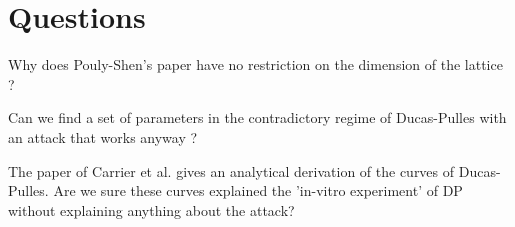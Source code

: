 \documentclass{article}
\begin{document}
\section{Questions} 

Why does Pouly-Shen's paper have no restriction on the dimension of the lattice ?

Can we find a set of parameters in the contradictory regime of Ducas-Pulles with an attack that works anyway ?

The paper of Carrier et al. gives an analytical derivation of the curves of Ducas-Pulles. Are we sure these curves explained the 'in-vitro experiment' of DP without explaining anything about the attack?



\end{document}
